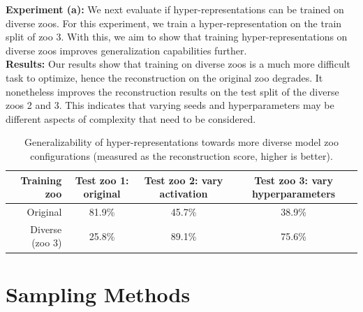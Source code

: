 \textbf{Experiment (a):} We next evaluate if hyper-representations can be trained on diverse zoos. For this experiment, we train a hyper-representation on the train split of zoo 3. With this, we aim to show that training hyper-representations on diverse zoos improves generalization capabilities further. \\
\textbf{Results:} Our results show that training on diverse zoos is a much more difficult task to optimize, hence the reconstruction on the original zoo degrades. It nonetheless improves the reconstruction results on the test split of the diverse zoos 2 and 3. This indicates that varying seeds and hyperparameters may be different aspects of complexity that need to be considered. 
\begin{table}[ht!]
\begin{minipage}[t]{0.98\textwidth}
\centering
{\small
\caption{Generalizability of hyper-representations towards more diverse model zoo configurations (measured as the reconstruction score, higher is better).}
\begin{tabular}{@{}rccc@{}}
\toprule
\textbf{Training zoo}    & \textbf{Test zoo 1: original}  & \textbf{Test zoo 2: vary activation} & \textbf{Test zoo 3: vary hyperparameters} \\
\midrule
Original        & 81.9\%               & 45.7\%                                              & 38.9\%                           \\
Diverse (zoo 3) & 25.8\%               & 89.1\%                                              & 75.6\%                          \\
\bottomrule
\end{tabular}
}
\label{tab:hyper_rep_generalization}
\end{minipage}
\vspace{-.2in}
\end{table}
\newpage
\section{Sampling Methods }
\label{app:sampling}
%
